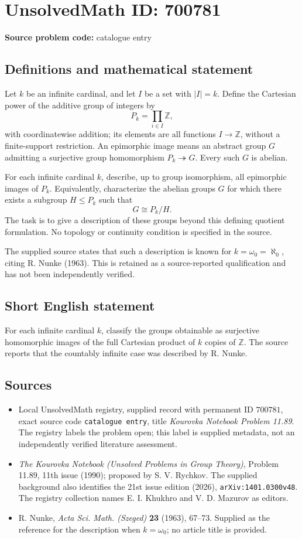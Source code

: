 \documentclass[11pt]{article}
\newcommand{\Z}{\mathbb{Z}}
\begin{document}
\section*{UnsolvedMath ID: 700781}
\textbf{Source problem code:} catalogue entry
\subsection{Definitions and mathematical statement}
Let \(k\) be an infinite cardinal, and let \(I\) be a set with \(|I|=k\). Define the Cartesian power of the additive group of integers by
\[
P_k=\prod_{i\in I}\Z,
\]
with coordinatewise addition; its elements are all functions \(I\to\Z\), without a finite-support restriction. An epimorphic image means an abstract group \(G\) admitting a surjective group homomorphism \(P_k\twoheadrightarrow G\). Every such \(G\) is abelian.

For each infinite cardinal \(k\), describe, up to group isomorphism, all epimorphic images of \(P_k\). Equivalently, characterize the abelian groups \(G\) for which there exists a subgroup \(H\leq P_k\) such that
\[
G\cong P_k/H.
\]
The task is to give a description of these groups beyond this defining quotient formulation. No topology or continuity condition is specified in the source.

The supplied source states that such a description is known for \(k=\omega_0=\aleph_0\), citing R. Nunke (1963). This is retained as a source-reported qualification and has not been independently verified.
\subsection{Short English statement}
For each infinite cardinal \(k\), classify the groups obtainable as surjective homomorphic images of the full Cartesian product of \(k\) copies of \(\Z\). The source reports that the countably infinite case was described by R. Nunke.
\subsection{Sources}
\begin{itemize}
\item Local UnsolvedMath registry, supplied record with permanent ID \(700781\), exact source code \texttt{catalogue entry}, title \emph{Kourovka Notebook Problem 11.89}. The registry labels the problem open; this label is supplied metadata, not an independently verified literature assessment.
\item \emph{The Kourovka Notebook (Unsolved Problems in Group Theory)}, Problem 11.89, 11th issue (1990); proposed by S. V. Rychkov. The supplied background also identifies the 21st issue edition (2026), \texttt{arXiv:1401.0300v48}. The registry collection names E. I. Khukhro and V. D. Mazurov as editors.
\item R. Nunke, \emph{Acta Sci. Math. (Szeged)} \textbf{23} (1963), 67--73. Supplied as the reference for the description when \(k=\omega_0\); no article title is provided.
\end{itemize}
\end{document}
